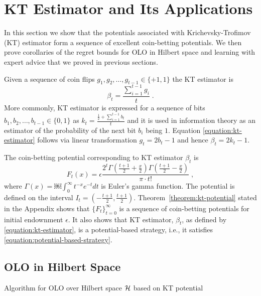 \section{KT Estimator and Its Applications}
\label{section:kt-estimator}

In this section we show that the potentials associated with Krichevsky-Trofimov
(KT) estimator form a sequence of excellent coin-betting potentials. We then
prove corollaries of the regret bounds for OLO in Hilbert space and learning
with expert advice that we proved in previous sections.

Given a sequence of coin flips $g_1, g_2, \dots, g_{t-1} \in \{+1,1\}$
the KT estimator is
\begin{equation}
\label{equation:kt-estimator}
\beta_t = \frac{\sum_{i=1}^{t-1} g_i}{t} \; .
\end{equation}
More commonly, KT estimator is expressed for a sequence of bits $b_1, b_2,
\dots, b_{t-1} \in \{0,1\}$ as $k_t = \frac{\frac{1}{2} + \sum_{i=1}^{t-1}
b_t}{t}$ and it is used in information theory as an estimator
of the probability of the next bit $b_i$ being $1$. Equation
\eqref{equation:kt-estimator} follows via linear transformation $g_t = 2b_t - 1$
and hence $\beta_t = 2k_t - 1$.

The coin-betting potential corresponding to KT estimator $\beta_t$ is
\begin{equation}
\label{equation:kt-estimator-potential}
F_t(x) = \epsilon \frac{2^t \Gamma(\frac{t+1}{2} + \frac{x}{2}) \Gamma(\frac{t+1}{2} - \frac{x}{2})}{\pi \cdot t!} \; ,
\end{equation}
where $\Gamma(x) = ￼\int_0^\infty t^{-x} e^{-t} dt$ is Euler's gamma function.
The potential is defined on the interval $I_t = (-\frac{t+1}{2},
\frac{t+1}{2})$. Theorem~\ref{theorem:kt-potential} stated in the Appendix shows
that $\{F_t\}_{t=0}^\infty$ is a sequence of coin-betting potentials for initial
endownment $\epsilon$. It also shows that KT estimator, $\beta_t$, as defined by
\eqref{equation:kt-estimator}, is a potential-based strategy, i.e., it satisfies
\eqref{equation:potential-based-strategy}.

\subsection{OLO in Hilbert Space}

\begin{algorithm}[t]
\caption{Algorithm for OLO over Hilbert space $\mathcal{H}$ based on KT potential
\label{algorithm:kt-hilbert-space-olo}}
\begin{algorithmic}
{
\ENDFOR
}
\end{algorithmic}
\end{algorithm}


